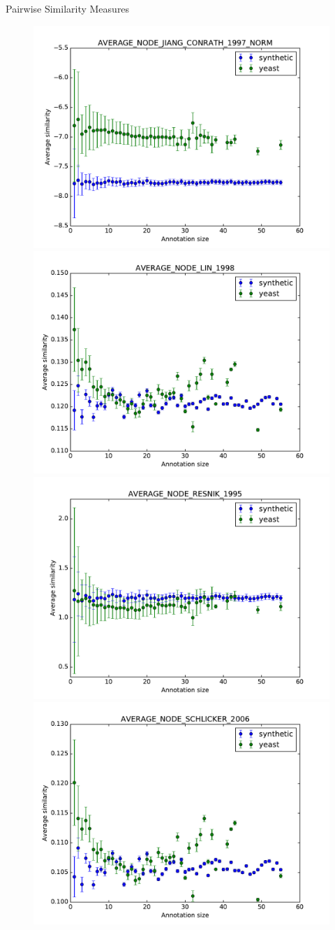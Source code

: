 \documentclass{beamer}
\begin{document}
\begin{frame}{Pairwise Similarity Measures}
\begin{figure}
\includegraphics[width=0.5\linewidth, height=0.4\textheight]{pairwise/SIM_GROUPWISE_AVERAGE_SIM_PAIRWISE_DAG_NODE_JIANG_CONRATH_1997_NORM_avg.pdf}
\includegraphics[width=0.5\linewidth, height=0.4\textheight]{pairwise/SIM_GROUPWISE_AVERAGE_SIM_PAIRWISE_DAG_NODE_LIN_1998_avg.pdf} \\
\includegraphics[width=0.5\linewidth, height=0.4\textheight]{pairwise/SIM_GROUPWISE_AVERAGE_SIM_PAIRWISE_DAG_NODE_RESNIK_1995_avg.pdf}
\includegraphics[width=0.5\linewidth, height=0.4\textheight]{pairwise/SIM_GROUPWISE_AVERAGE_SIM_PAIRWISE_DAG_NODE_SCHLICKER_2006_avg.pdf}
\end{figure}
\end{frame}
\end{document}
